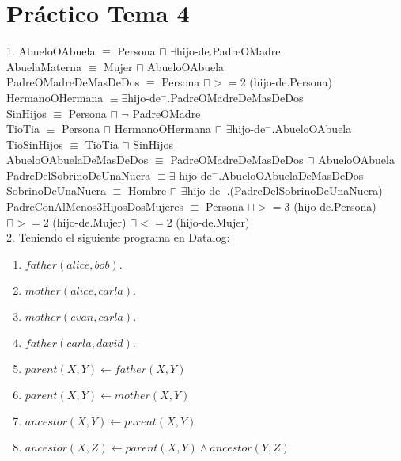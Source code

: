 \chapter{Práctico Tema 4}

1. AbueloOAbuela $\equiv$ Persona $\sqcap$ $\exists$hijo-de.PadreOMadre\\ 

AbuelaMaterna $\equiv$ Mujer $\sqcap$ AbueloOAbuela\\


PadreOMadreDeMasDeDos $\equiv$ Persona $\sqcap >= $2 (hijo-de.Persona)\\

HermanoOHermana $\equiv \exists$hijo-de$^-$.PadreOMadreDeMasDeDos\\

SinHijos $\equiv$ Persona $\sqcap$ $\neg$ PadreOMadre\\

TioTia $\equiv$ Persona $\sqcap$ HermanoOHermana $\sqcap$  $\exists$hijo-de$^-$.AbueloOAbuela\\

TioSinHijos $\equiv$ TioTia $\sqcap$ SinHijos\\


AbueloOAbuelaDeMasDeDos $\equiv$ PadreOMadreDeMasDeDos $\sqcap$ AbueloOAbuela\\

PadreDelSobrinoDeUnaNuera $\equiv \exists$ hijo-de$^-$.AbueloOAbuelaDeMasDeDos \\

SobrinoDeUnaNuera $\equiv$ Hombre $\sqcap$ $\exists$hijo-de$^-$.(PadreDelSobrinoDeUnaNuera)\\


PadreConAlMenos3HijosDosMujeres $\equiv$ Persona $\sqcap >=$3 (hijo-de.Persona) $\sqcap >=$2 (hijo-de.Mujer) $\sqcap <=$2 (hijo-de.Mujer)\\



2. Teniendo el siguiente programa en Datalog: \\

\begin{enumerate}
	\item $father(alice, bob).$
	\item $mother(alice, carla).$
	\item $mother(evan, carla).$
	\item $father(carla, david).$

	\item $parent(X, Y) \gets father(X, Y)$
	\item $parent(X, Y) \gets mother(X, Y)$
	\item $ancestor(X, Y) \gets parent(X, Y)$
	\item $ancestor(X,Z) \gets parent(X, Y) \land ancestor(Y, Z)$
\end{enumerate}

